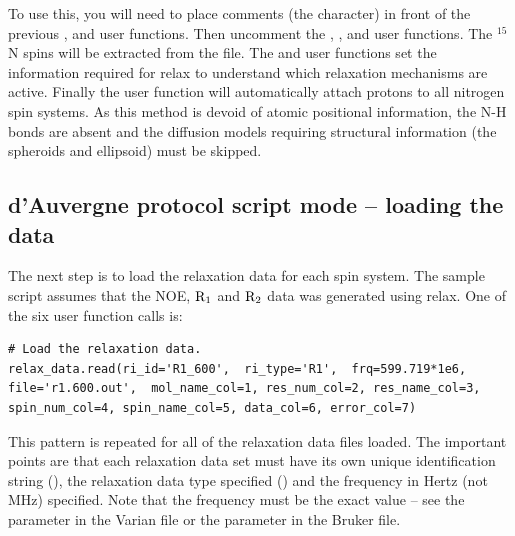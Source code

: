 \begin{htmlonly}
\begin{htmlonly}
To use this, you will need to place comments (the \pycode{\#} character) in front of the previous ,  and  user functions.  Then uncomment the , ,  and  user functions.  The $^{15}$N spins will be extracted from the  file.  The  and  user functions set the information required for relax to understand which relaxation mechanisms are active.  Finally the  user function will automatically attach protons to all nitrogen spin systems.  As this method is devoid of atomic positional information, the N-H bonds are absent and the diffusion models requiring structural information (the spheroids and ellipsoid) must be skipped.



\subsection{d'Auvergne protocol script mode -- loading the data}

The next step is to load the relaxation data for each spin system.  The sample script assumes that the NOE, $\mathrm{R}_1$ and $\mathrm{R}_2$ data was generated using relax.  One of the six user function calls is:

\begin{lstlisting}[firstnumber=180]
# Load the relaxation data.
relax_data.read(ri_id='R1_600',  ri_type='R1',  frq=599.719*1e6, file='r1.600.out',  mol_name_col=1, res_num_col=2, res_name_col=3, spin_num_col=4, spin_name_col=5, data_col=6, error_col=7)
\end{lstlisting}

This pattern is repeated for all of the relaxation data files loaded.  The important points are that each relaxation data set must have its own unique identification string (), the relaxation data type specified () and the frequency in Hertz (not MHz) specified.  Note that the frequency must be the exact value -- see the  parameter in the Varian  file or the  parameter in the Bruker  file.



\end{htmlonly}
\end{htmlonly}
